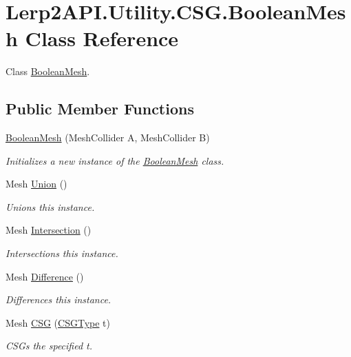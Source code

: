 \hypertarget{class_lerp2_a_p_i_1_1_utility_1_1_c_s_g_1_1_boolean_mesh}{}\section{Lerp2\+A\+P\+I.\+Utility.\+C\+S\+G.\+Boolean\+Mesh Class Reference}
\label{class_lerp2_a_p_i_1_1_utility_1_1_c_s_g_1_1_boolean_mesh}


Class \hyperlink{class_lerp2_a_p_i_1_1_utility_1_1_c_s_g_1_1_boolean_mesh}{Boolean\+Mesh}.  


\subsection*{Public Member Functions}
\begin{DoxyCompactItemize}
\item 
\hyperlink{class_lerp2_a_p_i_1_1_utility_1_1_c_s_g_1_1_boolean_mesh_a0a3daa9991d84662722a8f290c609942}{Boolean\+Mesh} (Mesh\+Collider A, Mesh\+Collider B)
\begin{DoxyCompactList}\small\item\em Initializes a new instance of the \hyperlink{class_lerp2_a_p_i_1_1_utility_1_1_c_s_g_1_1_boolean_mesh}{Boolean\+Mesh} class. \end{DoxyCompactList}\item 
Mesh \hyperlink{class_lerp2_a_p_i_1_1_utility_1_1_c_s_g_1_1_boolean_mesh_a338d14c44c5e1ac47590d4c98f2f5891}{Union} ()
\begin{DoxyCompactList}\small\item\em Unions this instance. \end{DoxyCompactList}\item 
Mesh \hyperlink{class_lerp2_a_p_i_1_1_utility_1_1_c_s_g_1_1_boolean_mesh_a38d9c3620118f473aa35d109757351d2}{Intersection} ()
\begin{DoxyCompactList}\small\item\em Intersections this instance. \end{DoxyCompactList}\item 
Mesh \hyperlink{class_lerp2_a_p_i_1_1_utility_1_1_c_s_g_1_1_boolean_mesh_afa31e92b5d86cfe64f83cb51e31fa43e}{Difference} ()
\begin{DoxyCompactList}\small\item\em Differences this instance. \end{DoxyCompactList}\item 
Mesh \hyperlink{class_lerp2_a_p_i_1_1_utility_1_1_c_s_g_1_1_boolean_mesh_a41875c32314674c721a6b7abcd333286}{C\+SG} (\hyperlink{namespace_lerp2_a_p_i_1_1_utility_1_1_c_s_g_a2deac4fec3ded614ea4aa42e1a7155db}{C\+S\+G\+Type} t)
\begin{DoxyCompactList}\small\item\em C\+S\+Gs the specified t. \end{DoxyCompactList}\end{DoxyCompactItemize}


